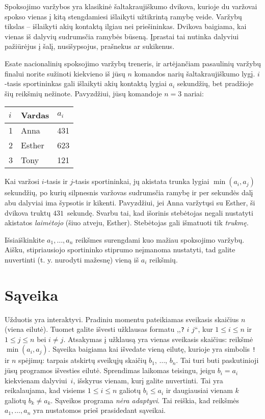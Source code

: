 

\noindent
Spoksojimo varžybos yra klasikinė šaltakraujiškumo dvikova, 
kurio\-je du varžovai spokso vienas į kitą stengdamiesi išlaikyti užtikrintą ramybę veide.
Varžybų tikslas -- išlaikyti akių kontaktą ilgiau nei priešininkas.
Dvikova baigiama, kai vienas iš dalyvių sudrums\-čia ramybės būseną. 
Įprastai tai nutinka dalyviui pažiūrėjus į šalį, nusišypsojus, prašnekus ar sukikenus.

Esate nacionalinių spoksojimo varžybų treneris, ir artėjančiam pasaulinių varžybų finalui
norite sužinoti kiekvieno iš jūsų $n$ komandos narių šaltakraujiškumo lygį.
$i$-tasis sportininkas gali išlaikyti akių kontaktą lygiai $a_i$ sekundžių, bet pradžioje šių reikšmių nežinote.
Pavyzdžiui, jūsų komandoje $n=3$ nariai:

\medskip
\begin{tabular}{lll}
  $i$ & Vardas & $a_i$\\\hline
  1 & Anna &  431 \\
  2 & Esther & 623 \\
  3 & Tony &  121\\
\end{tabular}

\medskip
Kai  varžosi $i$-tasis ir $j$-tasis sportininkai, jų akistata trunka lygiai $\min(a_i, a_j)$ sekundžių, 
po kurių silpnesnis varžovas sudrumsčia ramybę ir per sekundės dalį abu dalyviai ima šypsotis ir kikenti.
Pavyzdžiui, jei Anna varžytųsi su Esther, ši dvikova truktų $431$~sekundę.
Svarbu tai, kad išorinis stebėtojas negali nustatyti akistatos \emph{laimėtojo} (šiuo atveju, Esther).
Stebėtojas gali išmatuoti tik \emph{trukmę}.

Išsiaiškinkite $a_1,\ldots, a_n$ reikšmes surengdami kuo mažiau spoksojimo varžybų.
Aišku, stipriausiojo sportininko stiprumo neįmanoma nustatyti, tad galite nuvertinti (t. y. nurodyti mažesnę) vieną iš $a_i$ reikšmių.

\section*{Sąveika}

Užduotis yra interaktyvi.
Pradiniu momentu pateikiamas sveikasis skaičius $n$ (viena eilutė).
Tuomet galite išvesti užklausas formatu ,,\texttt{?} $i$ $j$``, kur $1\leq i\leq n$ ir $1\leq j\leq n$ bei $i\neq j$.
Atsakymas į užklausą yra vienas sveikasis skaičius: reikšmė $\min(a_i, a_j)$.
Sąveika baigiama kai išvedate vieną eilutę, kurioje yra simbolis \texttt{!} ir
$n$ spėjimų: tarpais atskirtų sveikųjų skaičių $b_1$, $\ldots$, $b_n$.  
Tai turi buti paskutinioji jūsų programos išvesties eilutė.
Sprendimas laikomas teisingu, jeigu $b_i=a_i$ kiekvienam dalyviui~$i$, išskyrus vienam, 
kurį galite nuvertinti.
Tai yra reikalaujama, kad visiems $1\leq i\leq n$ galiotų $b_i\leq a_i$
ir daugiausiai vienam $k$ galiotų $b_k \neq a_k$.
Sąveikos programa \emph{nėra adaptyvi}. Tai reiškia, kad reikšmės $a_1,\ldots, a_n$ yra nustatomos prieš prasidedant sąveikai.

